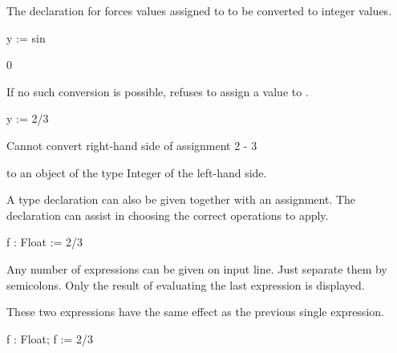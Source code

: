 {{{{{{{{\begin{xtc}
\begin{xtccomment}
The declaration for  forces values assigned to  to
be converted to integer values.
\end{xtccomment}
\begin{spadsrc}
y := sin %
\end{spadsrc}
\begin{TeXOutput}
\begin{fricasmath}{6}
0%
\end{fricasmath}
\end{TeXOutput}
\end{xtc}
\begin{xtc}
\begin{xtccomment}
If no such conversion is possible,
\Language{} refuses to assign a value to .
\end{xtccomment}
\begin{spadsrc}
y := 2/3
\end{spadsrc}
\begin{MessageOutput}
   Cannot convert right-hand side of assignment
   2
   -
   3

      to an object of the type Integer of the left-hand side.
\end{MessageOutput}
\end{xtc}
\begin{xtc}
\begin{xtccomment}
A type declaration can also be given together with an assignment.
The declaration can assist \Language{} in choosing the correct
operations to apply.
\end{xtccomment}
\begin{spadsrc}
f : Float := 2/3
\end{spadsrc}
\begin{TeXOutput}
\begin{fricasmath}{7}
%
\end{fricasmath}
\end{TeXOutput}
\end{xtc}

Any number of expressions can be given on input line.
Just separate them by semicolons.
Only the result of evaluating the last expression is displayed.

\begin{xtc}
\begin{xtccomment}
These two expressions have the same effect as
the previous single expression.
\end{xtccomment}
\begin{spadsrc}
f : Float; f := 2/3 
\end{spadsrc}
\begin{TeXOutput}
\begin{fricasmath}{8}
%
\end{fricasmath}
\end{TeXOutput}
\end{xtc}

}}}}}}}}
